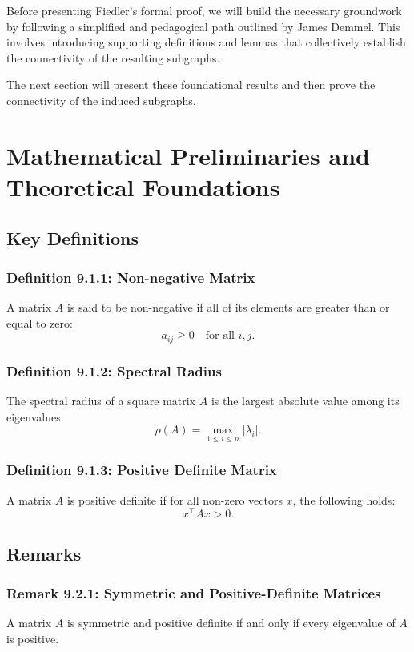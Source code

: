 \documentclass[hidelinks,12pt]{article}
\begin{document}
\medskip

\noindent Before presenting Fiedler’s formal proof, we will build the necessary groundwork by following a simplified and pedagogical path outlined by James Demmel. This involves introducing supporting definitions and lemmas that collectively establish the connectivity of the resulting subgraphs.
\bigskip

\noindent The next section will present these foundational results and then prove the connectivity of the induced subgraphs.
\newpage
\cleardoublepage
\section{Mathematical Preliminaries and Theoretical Foundations}

\subsection{Key Definitions}

\subsubsection*{\textbf{Definition 9.1.1: Non-negative Matrix}}
A matrix \( A \) is said to be non-negative if all of its elements are greater than or equal to zero:
\[
a_{ij} \geq 0 \quad \text{for all } i, j.
\]

\subsubsection*{\textbf{Definition 9.1.2: Spectral Radius}}
The spectral radius of a square matrix \( A \) is the largest absolute value among its eigenvalues:
\[
\rho(A) = \max_{1 \leq i \leq n} |\lambda_i|.
\]

\subsubsection*{\textbf{Definition 9.1.3: Positive Definite Matrix}} 
A matrix \( A \) is positive definite if for all non-zero vectors \( x \), the following holds:
\[
x^\top A x > 0.
\]

\subsection{Remarks}

\subsubsection*{\textbf{Remark 9.2.1: Symmetric and Positive-Definite Matrices}} 
A matrix \( A \) is symmetric and positive definite if and only if every eigenvalue of \( A \) is positive.
\end{document}

